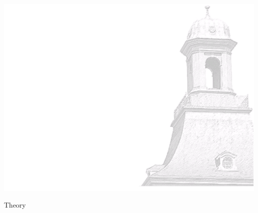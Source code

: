 \documentclass[xcolor=dvipsnames]{beamer}
\begin{document}
    
    {\usebackgroundtemplate%
        {%
            \includegraphics[width=\paperwidth,height=\paperheight]{bkg1.pdf}%
        }
        \begin{frame}
            \centering \Huge \color{ublue} Theory
            \thispagestyle{empty}
            \addtocounter{framenumber}{-1}
        \end{frame}
    }
\end{document}
